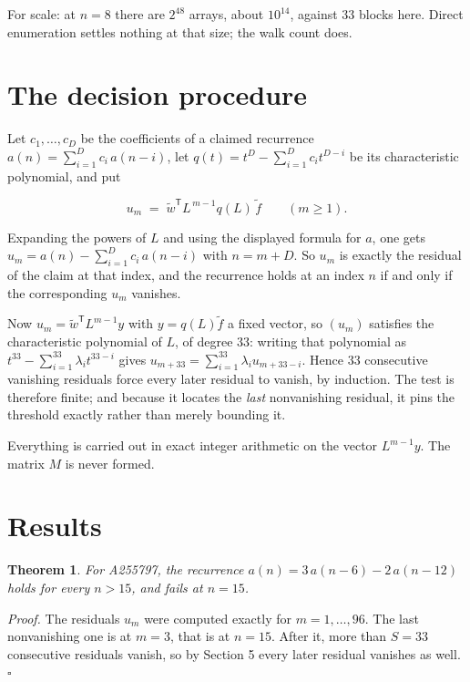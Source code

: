 \documentclass[11pt]{article}
\newtheorem{theorem}{Theorem}
\theoremstyle{definition}
\begin{document}
For scale: at $n = 8$ there are $2^{48}$ arrays, about $10^{14}$, against $33$ blocks here. Direct enumeration settles nothing at that size; the walk count does.

\section{The decision procedure}

Let $c_1,\dots,c_D$ be the coefficients of a claimed recurrence $a(n) = \sum_{i=1}^{D} c_i\,a(n-i)$, let $q(t) = t^{D} - \sum_{i=1}^{D} c_i t^{D-i}$ be its characteristic polynomial, and put

\[u_m \;=\; \tilde w^{\mathsf T} L^{\,m-1} q(L)\,\tilde f \qquad (m \ge 1).\]

Expanding the powers of $L$ and using the displayed formula for $a$, one gets $u_m = a(n) - \sum_{i=1}^{D} c_i\,a(n-i)$ with $n = m + D$. So $u_m$ is exactly the residual of the claim at that index, and the recurrence holds at an index $n$ if and only if the corresponding $u_m$ vanishes.

Now $u_m = \tilde w^{\mathsf T} L^{m-1} y$ with $y = q(L)\tilde f$ a fixed vector, so $(u_m)$ satisfies the characteristic polynomial of $L$, of degree $33$: writing that polynomial as $t^{33} - \sum_{i=1}^{33} \lambda_i t^{33-i}$ gives $u_{m+33} = \sum_{i=1}^{33} \lambda_i u_{m+33-i}$. Hence $33$ consecutive vanishing residuals force every later residual to vanish, by induction. The test is therefore finite; and because it locates the {\itshape last} nonvanishing residual, it pins the threshold exactly rather than merely bounding it.

Everything is carried out in exact integer arithmetic on the vector $L^{m-1}y$. The matrix $M$ is never formed.

\section{Results}

\begin{theorem} For A255797, the recurrence $a(n) = 3\,a(n-6) - 2\,a(n-12)$ holds for every $n > 15$, and fails at $n = 15$.\end{theorem}

{\itshape Proof.} The residuals $u_m$ were computed exactly for $m = 1,\dots,96$. The last nonvanishing one is at $m = 3$, that is at $n = 15$. After it, more than $S = 33$ consecutive residuals vanish, so by Section 5 every later residual vanishes as well. $\square$
\end{document}
